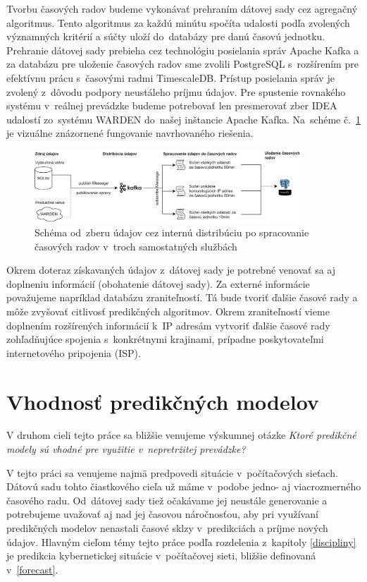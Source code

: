\documentclass[thesismargins, thesislinespacing, openright, upjsfrontpage]{rnthesis}
\begin{document}
Tvorbu časových radov budeme vykonávať prehraním dátovej sady cez agregačný algoritmus. Tento algoritmus za každú minútu spočíta udalosti podľa zvolených výz\-namných kritérií a súčty uloží do~databázy pre danú časovú jednotku. Prehranie dátovej sady prebieha cez technológiu posielania správ Apache Kafka a za databázu pre uloženie časových radov sme zvolili PostgreSQL s~rozšírením pre efektívnu prácu s~časovými radmi TimescaleDB. Prístup posielania správ je zvolený z~dôvodu podpory neustáleho príjmu údajov. Pre spustenie rovnakého systému v~reálnej prevádzke budeme potrebovať len presmerovať zber IDEA udalostí zo~systému WARDEN do~našej inštancie Apache Kafka. Na~schéme č.~\ref{fig:c1_schema} je vizuálne znázornené fungovanie navrhovaného riešenia.

\begin{figure}[h]
  \centering
  \includegraphics[width=0.9\textwidth]{images/metodologia1.png}
  \caption{Schéma od~zberu údajov cez internú distribúciu po spracovanie časových radov v~troch samostatných službách}
  \label{fig:c1_schema}
\end{figure}

Okrem doteraz získavaných údajov z~dátovej sady je potrebné venovať sa aj doplneniu informácií (obohatenie dátovej sady). Za externé informácie považujeme napríklad databázu zraniteľností. Tá bude tvoriť ďalšie časové rady a môže zvyšovať citlivosť predikčných algoritmov. Okrem zraniteľností vieme doplnením rozšírených informácií k~IP adresám vytvoriť ďalšie časové rady zohľadňujúce spojenia s~konkrétnymi krajinami, prípadne poskytovateľmi internetového pripojenia (ISP).

\section{Vhodnosť predikčných modelov}
V druhom cieli tejto práce sa bližšie venujeme výskumnej otázke \textit{Ktoré predikčné modely sú vhodné pre využitie v~nepretržitej prevádzke?}

V tejto práci sa venujeme najmä predpovedi situácie v~počítačových sieťach. Dátovú sadu tohto čiastkového cieľa už máme v~podobe jedno- aj viacrozmerného časového radu. Od~dátovej sady tiež očakávame jej neustále generovanie a potrebujeme uvažovať aj nad jej časovou náročnosťou, aby pri využívaní predikčných modelov nenastali časové sklzy v~predikciách a príjme nových údajov. Hlavným cieľom témy tejto práce podľa rozdelenia z~kapitoly \ref{discipliny} je predikcia kybernetickej situácie v~počítačovej sieti, bližšie definovaná v~\ref{forecast}.
\end{document}
